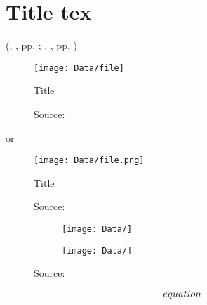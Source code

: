 
\section[Title]{\texorpdfstring{Title tex}{Title pdf}}


\textcolor{HCU}{}
\textcolor{red1}{}




(\citeauthor{}, \citeyearNP{}, pp. ; \citeauthor{}, \citeyearNP{}, pp. )


\begin{figure}[H]
	\centering
	\texttt{[image: Data/file]}
	\caption{Title}
	\caption*{Source: \citeA{}}
	\label{fig:}
\end{figure}

or



\begin{figure}[H]
	\centering
	\texttt{[image: Data/file.png]}
	\caption{Title}
	\caption*{Source: \citeA{}}
	\label{fig:}
\end{figure}


\begin{figure}[H]
	\begin{subfigure}[c]{0.48\textwidth}
		\texttt{[image: Data/]}
		\subcaption{}
		\label{fig:}
	\end{subfigure}
	\hfill
	\begin{subfigure}[c]{0.48\textwidth}
		\texttt{[image: Data/]}
		\subcaption{}
		\label{fig:}
	\end{subfigure}
	\caption{}
	\caption*{Source: \citeA[]{}}
	\label{fig:}
\end{figure}


\begin{equation}
	\numberwithin{equation}{section}
	equation \label{eq:Label} \\
\end{equation}





